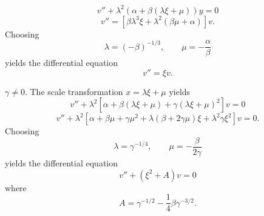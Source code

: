 {\begin{Solution}
\begin{description}
\begin{description}
      \[
      v'' + \lambda^2 (\alpha + \beta (\lambda \xi + \mu)) y = 0
      \]
      \[
      v'' = [  \beta \lambda^3 \xi + \lambda^2 (\beta \mu + \alpha)]v.
      \]
      Choosing
      \[
      \lambda = (-\beta)^{-1/3}, \qquad \mu = - \frac{\alpha}{\beta}
      \]
      yields the differential equation
      \[
      v'' = \xi v.
      \]
    \end{description}
  \item{$\gamma \neq 0$.}
    The scale transformation $x = \lambda \xi + \mu$ yields
    \[
    v'' + \lambda^2 [\alpha + \beta(\lambda \xi + \mu) 
    + \gamma(\lambda \xi + \mu)^2] v = 0
    \]
    \[
    v'' + \lambda^2 [ \alpha + \beta \mu + \gamma \mu^2
    + \lambda (\beta + 2 \gamma \mu) \xi + \lambda^2 \gamma \xi^2]v=0.
    \]
    Choosing
    \[
    \lambda = \gamma^{-1/4}, \qquad \mu = -\frac{\beta}{2 \gamma}
    \]
    yields the differential equation
    \[
    v'' + (\xi^2 + A) v = 0
    \]
    where
    \[
    A = \gamma^{-1/2} - \frac{1}{4} \beta \gamma^{-3/2}.
    \]
  \end{description}
\end{Solution}








}
